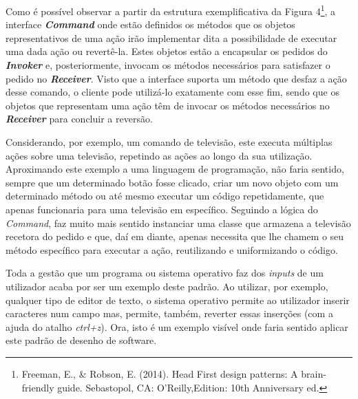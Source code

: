 \documentclass[10pt,portuguese]{article}
\begin{document}
\par Como é possível observar a partir da estrutura exemplificativa da Figura 4\footnote{Freeman, E., & Robson, E. (2014). Head First design patterns: A brain-friendly guide. Sebastopol, CA: O’Reilly,Edition: 10th Anniversary ed.}, a interface \textbf{\textit{Command}} onde estão definidos os métodos que os objetos representativos de uma ação irão implementar dita a possibilidade de executar uma dada ação ou revertê-la. Estes objetos estão a encapsular os pedidos do \textit{\textbf{Invoker}} e, posteriormente, invocam os métodos necessários para satisfazer o pedido no \textit{\textbf{Receiver}}. Visto que a interface suporta um método que desfaz a ação desse comando, o cliente pode utilizá-lo exatamente com esse fim, sendo que os objetos que representam uma ação têm de invocar os métodos necessários no \textit{\textbf{Receiver}} para concluir a reversão.

\par Considerando, por exemplo, um comando de televisão, este executa múltiplas ações sobre uma televisão, repetindo as ações ao longo da sua utilização. Aproximando este exemplo a uma linguagem de programação, não faria sentido, sempre que um determinado botão fosse clicado, criar um novo objeto com um determinado método ou até mesmo executar um código repetidamente, que apenas funcionaria para uma televisão em específico. 
Seguindo a lógica do \textit{Command}, faz muito mais sentido instanciar uma classe que armazena a televisão recetora do pedido e que, daí em diante, apenas necessita que lhe chamem o seu método específico para executar a ação, reutilizando e uniformizando o código. 

\par Toda a gestão que um programa ou sistema operativo faz dos \textit{inputs} de um utilizador acaba por ser um exemplo deste padrão. 
Ao utilizar, por exemplo, qualquer tipo de editor de texto, o sistema operativo permite ao utilizador inserir caracteres num campo mas, permite, também, reverter essas inserções (com a ajuda do atalho \textit{ctrl+z}). Ora, isto é um exemplo visível onde faria sentido aplicar este padrão de desenho de software.
\end{document}
